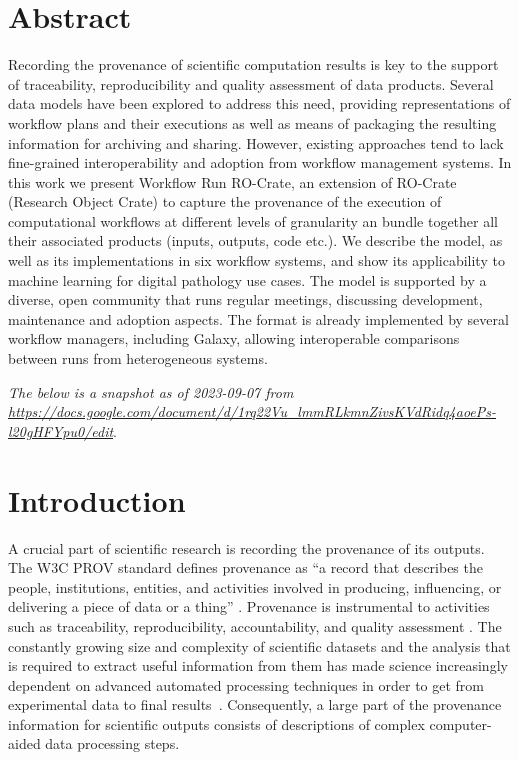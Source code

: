 \documentclass[10pt,letterpaper]{article}
\begin{document}
\section*{Abstract}
Recording the provenance of scientific computation results is
key to the support of traceability, reproducibility and quality
assessment of data products. Several data models have been explored to
address this need, providing representations of workflow plans and their
executions as well as means of packaging the resulting information for
archiving and sharing. However, existing approaches tend to lack fine-grained interoperability and adoption from workflow management systems. In this work we present
Workflow Run RO-Crate, an extension of RO-Crate (Research Object Crate)
to capture the provenance of the execution of computational workflows at
different levels of granularity an bundle together all their associated products (inputs, outputs, code etc.). We describe the model, as well as its
implementations in six workflow systems, and show its applicability to
machine learning for digital pathology use cases. The model is supported
by a diverse, open community that runs regular meetings, discussing
development, maintenance and adoption  aspects. The format is already implemented by
several workflow managers, including Galaxy, allowing interoperable
comparisons between runs from heterogeneous systems.


\linenumbers



\emph{The below is a snapshot as of 2023-09-07 from
\url{https://docs.google.com/document/d/1rq22Vu_lmmRLkmnZivsKVdRidq4aoePs-l20gHFYpu0/edit}}.

\section{Introduction}\label{introduction}

A crucial part of scientific research is recording the provenance of its outputs.
The W3C PROV standard defines provenance as ``a record that describes the people, institutions, entities, and activities involved in producing, influencing, or delivering a piece of data or a thing''
\cite{Moreau 2013}.
Provenance is instrumental to activities such as traceability, reproducibility, accountability, and quality assessment
\cite{Herschel 2017}.
The constantly growing size and complexity of scientific datasets and the analysis that is required to extract useful information from them has made science increasingly dependent on advanced automated processing techniques in order to get from experimental data to final results~\cite{Himanen 2019, Gauthier 2019, Huntingford 2019}.
Consequently, a large part of the provenance information for scientific outputs consists of descriptions of complex computer-aided data processing steps.
\end{document}
